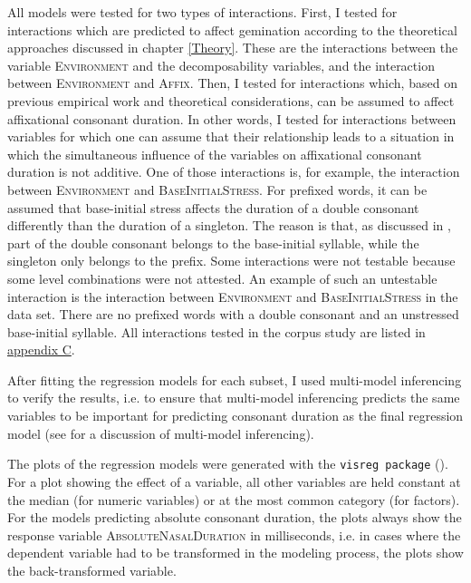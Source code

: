 All models were tested for two types of  interactions. First, I tested for interactions which are predicted to affect gemination according to the theoretical approaches discussed in chapter \ref{Theory}. These  are the interactions between the variable \textsc{Environment} and the decomposability variables, and the interaction between \textsc{Environment} and \textsc{Affix}.
Then, I tested for interactions which, based on previous empirical work and theoretical considerations, can be assumed to affect affixational consonant duration. In other words, I tested for interactions between variables for which one can assume that their relationship leads to a situation in which the simultaneous influence of the variables on affixational consonant duration is not additive. One of those interactions is, for example, the interaction between \textsc{Environment} and \textsc{BaseInitialStress}. For prefixed words, it can be assumed that base-initial stress affects the duration of a double consonant differently than the duration of a singleton. The reason is that, as discussed in , part of the double consonant belongs to the base-initial syllable, while the singleton only belongs to the prefix. 
Some interactions were not testable because some level combinations were not attested. An example of such an untestable interaction is the interaction between \textsc{Environment} and \textsc{BaseInitialStress} in the data set. There are no prefixed words with a double consonant and an unstressed base-initial syllable. All interactions tested in the corpus study are listed in \hyperref[Appendix C: Summaries of tested interactions in corpus study]{appendix C}.

After fitting the regression models for each subset, I used multi-model inferencing to verify the results, i.e. to ensure that multi-model inferencing predicts the same variables to be important for predicting consonant duration as the final regression model (see  for a discussion of multi-model inferencing).




The plots of the regression models were generated with the \texttt{visreg package} (\citealt{Breheny.2015}). For a plot showing the effect of a variable, all other variables are held constant at the median (for numeric variables) or at the most common category (for factors). For the models predicting absolute consonant duration, the plots always show the response variable \textsc{AbsoluteNasalDuration} in milliseconds, i.e. in cases where the dependent variable had to be transformed in the modeling process, the plots show the back-transformed variable.



